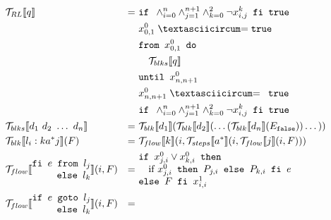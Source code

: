 \begin{figure}
  $$\begin{aligned}
    & \mathcal{T}_{RL}\llbracket q\rrbracket  & =\ & \texttt{if } \land_{i=0}^n\land_{j=1}^{n+1}\land_{k=0}^2\neg x_{i,j}^k\texttt{ fi true}\\
    &                                         &    & x_{0,1}^{0} \xoreq \texttt{true}\\
    &                                         &    & \texttt{from }x_{0,1}^0\texttt{ do}\\
    &                                         &    & \quad \mathcal{T}_{blks}\llbracket q\rrbracket\\
    &                                         &    & \texttt{until } x_{n,n+1}^0\\
    &                                         &    & x_{n,n+1}^0 \xoreq \texttt{ true}\\
    &                                         &    & \texttt{if } \land_{i=0}^n\land_{j=1}^{n+1}\land_{k=0}^2\neg x_{i,j}^k\texttt{ fi true}\\
    & \mathcal{T}_{blks}\llbracket d_1\ d_2\ \dots\ d_n\rrbracket & =\ &
      \mathcal{T}_{blk}\llbracket d_1 \rrbracket(\mathcal{T}_{blk}\llbracket d_2\rrbracket(\dots(\mathcal{T}_{blk}\llbracket d_n\rrbracket(E_\texttt{false}))\dots))\\
    & \mathcal{T}_{blk}\llbracket l_i : k a^* j \rrbracket(F) & =\ &
      \mathcal{T}_{flow}\llbracket k\rrbracket(i,\mathcal{T}_{steps}\llbracket a^*\rrbracket(i,\mathcal{T}_{flow}\llbracket j\rrbracket(i,F)))\\
    & \mathcal{T}_{flow}\llbracket\begin{matrix*}[r]\texttt{fi }e\texttt{ from }l_j\\\texttt{else }l_k\end{matrix*}\rrbracket(i,F) & =\ &
      \begin{matrix*}[l]
        \texttt{if }x_{j,i}^0\lor x_{k,i}^0\texttt{ then}\\
        \quad\text{if }x_{j,i}^0\texttt{ then }P_{j,i}\texttt{ else }P_{k,i}\texttt{ fi }e\\
        \texttt{else }F\texttt{ fi }x_{i,i}^1\\
      \end{matrix*}\\
    & \mathcal{T}_{flow}\llbracket\begin{matrix*}[r]\texttt{if }e\texttt{ goto }l_j\\\texttt{else }l_k\end{matrix*}\rrbracket(i,F) & =\ &

\end{aligned}$$
\end{figure}
